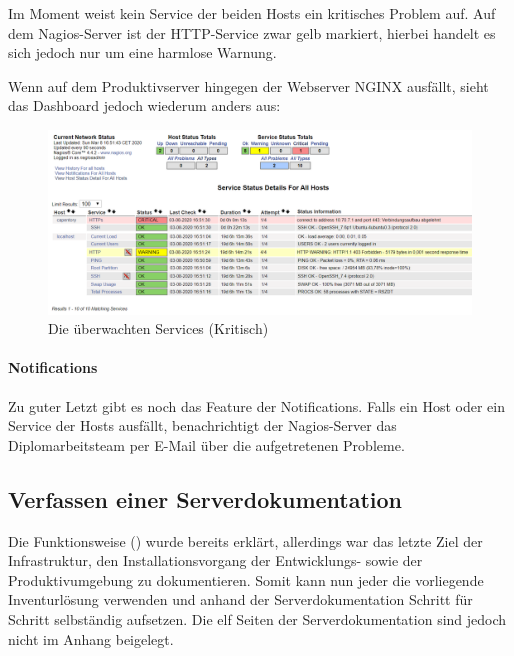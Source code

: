 \documentclass[
]{article}
\begin{document}
Im Moment weist kein Service der beiden Hosts ein kritisches Problem
auf. Auf dem Nagios-Server ist der HTTP-Service zwar gelb markiert,
hierbei handelt es sich jedoch nur um eine harmlose Warnung.

Wenn auf dem Produktivserver hingegen der Webserver NGINX ausfällt,
sieht das Dashboard jedoch wiederum anders aus:

\begin{figure}[ht]
\centering
\includegraphics{dednginx.png}
\caption{Die überwachten Services (Kritisch)}
\end{figure}

\hypertarget{notifications}{%
\paragraph{Notifications}\label{notifications}}

Zu gu­ter Letzt gibt es noch das Feature der Notifications. Falls ein
Host oder ein Service der Hosts ausfällt, benachrichtigt der
Nagios-Server das Diplomarbeitsteam per E-Mail über die aufgetretenen
Probleme.

\hypertarget{verfassen-einer-serverdokumentation}{%
\subsection{Verfassen einer
Serverdokumentation}\label{verfassen-einer-serverdokumentation}}

Die Funktionsweise () wurde
bereits erklärt, allerdings war das letzte Ziel der Infrastruktur, den
Installationsvorgang der Entwicklungs- sowie der Produktivumgebung zu
dokumentieren. Somit kann nun jeder die vorliegende Inventurlösung
verwenden und anhand der Serverdokumentation Schritt für Schritt
selbständig aufsetzen. Die elf Seiten der Serverdokumentation sind
jedoch nicht im Anhang beigelegt.
\end{document}

